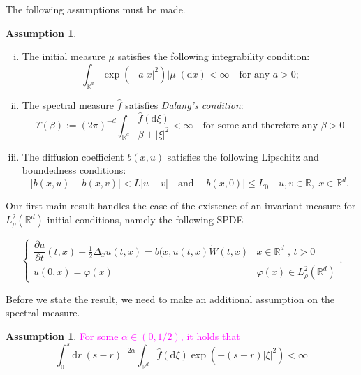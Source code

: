\documentclass[a4paper,11pt]{article}%
\numberwithin{equation}{section}
\theoremstyle{plain}
\theoremstyle{definition}
\newtheorem{assumptions}[theorem]{Assumption}
\newcommand{\R}{\mathbb{R}}
\newcommand{\ud}{\ensuremath{ \mathrm{d} }}
\begin{document}
The following assumptions must be made.
	\begin{assumptions}
		\label{A:General}
		\begin{enumerate}[(i)]
			\item The initial measure $\mu$ satisfies the following integrability condition:
			\begin{equation}
			\int_{\R^d}\exp\left(-a|x|^2\right)|\mu|(\ud x) < \infty \quad \text{for any $a>0$;} \label{A:icon}
			\end{equation}
			\item The spectral measure $\hat{f}$ satisfies {\it Dalang's condition}:
			\begin{equation}
			\Upsilon(\beta) := (2\pi)^{-d}\int_{\R^d}\dfrac{\hat f(\ud \xi)}{\beta + |\xi|^2} <
			\infty \quad \text{for some and therefore any $\beta>0$}  \label{A:dalcon}
			\end{equation}
			\item The diffusion coefficient $b(x,u)$ satisfies the following Lipschitz and boundedness conditions:
			\begin{equation}
			|b(x,u)-b(x,v)|< L |u-v| \quad \text{and} \quad |b(x,0)| \le L_0 \quad u,v \in \R, \; x \in \R^d \label{A:lipcon}.
			\end{equation}
		\end{enumerate}
	\end{assumptions}

Our first main result handles the case of the existence of an invariant measure for $L^2_{\rho}(\R^d)$ initial conditions, namely the following SPDE

\begin{equation}
\begin{cases}
\dfrac{\partial u}{\partial t}(t,x)-\frac{1}{2}\Delta_x u(t,x) = b(x,u(t,x)\dot W(t,x) & \text{$x\in \R^d$ , $t>0$}
\\ u(0,x)=\varphi(x) & \varphi(x) \in L^2_\rho(\R^d)
\end{cases}  \label{E:spde}.
\end{equation}

Before we state the result, we need to make an additional assumption on the spectral measure.

\begin{assumptions}
	\textcolor{magenta}{For some $\alpha\in \left(0,1/2\right)$, it holds that}
	\begin{equation}
	\int_0^s \ud r \: (s-r)^{-2\alpha} \int_{\R^{d}} \hat f(\ud \xi) \exp\left(-(s-r)|\xi|^2 \right) < \infty \label{A:fcon}
	\end{equation}
\end{assumptions}
\end{document}
